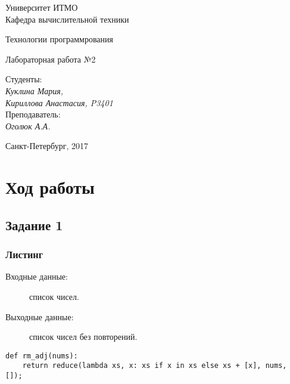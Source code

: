 \documentclass[12pt, a4paper] {ncc}
\begin{document}
\setcounter{figure}{0}
\frenchspacing
\pagestyle{empty}
\begin{center}
                            Университет ИТМО    \\
                        Кафедра вычислительной техники

                    Технологии программрования
\end{center}
\begin{center}
                            Лабораторная работа №2\\
\end{center}
\begin{flushright}
                                    Студенты:\\
                                    {\it Куклина Мария,}\\
                                    {\it Кириллова Анастасия, P3401}\\
                                    Преподаватель: \\
                                    {\it Оголюк А.А.}
\end{flushright}
\begin{center}
                             Санкт-Петербург, 2017
\end{center}
\newpage

\section{Ход работы}
    \subsection{Задание 1}
        \subsubsection{Листинг}
        \begin{description}
            \item[Входные данные:] список чисел.
            \item[Выходные данные:] список чисел без повторений. 
        \end{description}

        \lstset{language=Python}
        \begin{lstlisting}
def rm_adj(nums):
    return reduce(lambda xs, x: xs if x in xs else xs + [x], nums, []);
        \end{lstlisting}
\end{document}
